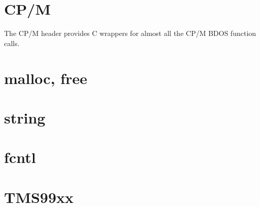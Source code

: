 \documentclass[10pt,a4paper]{article}
\begin{document}
\section{CP/M}
The CP/M header provides C wrappers for almost all the CP/M BDOS function calls.
\pagebreak

\section{malloc, free}
\pagebreak

\section{string}
\pagebreak

\section{fcntl}
\pagebreak

\section{TMS99xx}

\pagebreak
\end{document}

